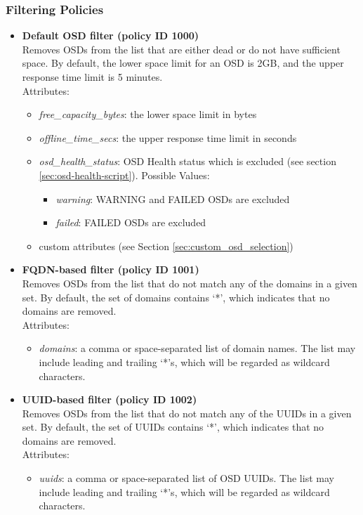 \documentclass[a4paper,10pt]{book}
\begin{document}
\subsubsection{Filtering Policies}
\begin{itemize}

 \item \textbf{Default OSD filter (policy ID 1000)}\\
 Removes OSDs from the list that are either dead or do not have sufficient space. By default, the lower space limit for an OSD is 2GB, and the upper response time limit is 5 minutes.\\

 Attributes:
 \begin{itemize}
 \item \emph{free\_capacity\_bytes}: the lower space limit in bytes
 \item \emph{offline\_time\_secs}: the upper response time limit in seconds
 \item \emph{osd\_health\_status}: OSD Health status which is excluded (see section \ref{sec:osd-health-script}). Possible Values:
 \begin{itemize}
 \item \emph{warning}: WARNING and FAILED OSDs are excluded
 \item \emph{failed}: FAILED OSDs are excluded
 \end{itemize}
 \item custom attributes (see Section \ref{sec:custom_osd_selection})
 \end{itemize}

 \item \textbf{FQDN-based filter (policy ID 1001)}\\
 Removes OSDs from the list that do not match any of the domains in a given set. By default, the set of domains contains `*', which indicates that no domains are removed.\\

 Attributes:
 \begin{itemize}
 \item \emph{domains}: a comma or space-separated list of domain names. The list may include leading and trailing `*'s, which will be regarded as wildcard characters.
 \end{itemize}

 \item \textbf{UUID-based filter (policy ID 1002)}\\
 Removes OSDs from the list that do not match any of the UUIDs in a given set. By default, the set of UUIDs contains `*', which indicates that no domains are removed.\\

 Attributes:
 \begin{itemize}
 \item \emph{uuids}: a comma or space-separated list of OSD UUIDs. The list may include leading and trailing `*'s, which will be regarded as wildcard characters.
 \end{itemize}

\end{itemize}
\end{document}
